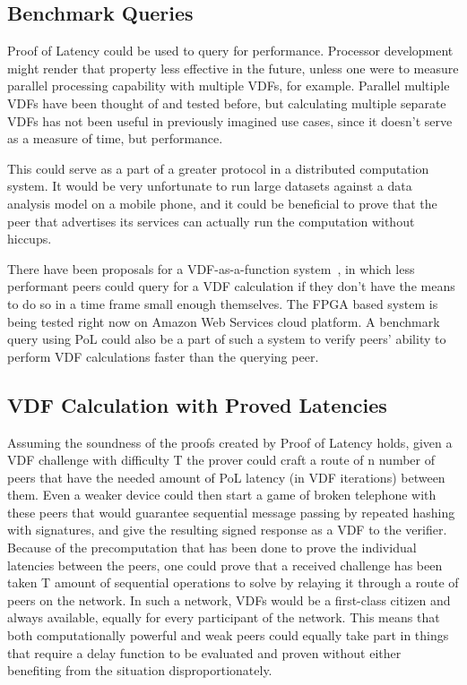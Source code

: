\subsection{Benchmark Queries}
Proof of Latency could be used to query for performance. Processor development might render that property less effective in the future, unless one were to measure parallel processing capability with multiple VDFs, for example. Parallel multiple VDFs have been thought of and tested before, but calculating multiple separate VDFs has not been useful in previously imagined use cases, since it doesn't serve as a measure of time, but performance.

This could serve as a part of a greater protocol in a distributed computation system. It would be very unfortunate to run large datasets against a data analysis model on a mobile phone, and it could be beneficial to prove that the peer that advertises its services can actually run the computation without hiccups.

There have been proposals for a VDF-as-a-function system~\cite{Devlin2020-qw}, in which less performant peers could query for a VDF calculation if they don't have the means to do so in a time frame small enough themselves. The FPGA based system is being tested right now on Amazon Web Services cloud platform. A benchmark query using PoL could also be a part of such a system to verify peers' ability to perform VDF calculations faster than the querying peer.

\subsection{VDF Calculation with Proved Latencies}
Assuming the soundness of the proofs created by Proof of Latency holds, given a VDF challenge with difficulty T the prover could craft a route of n number of peers that have the needed amount of PoL latency (in VDF iterations) between them. Even a weaker device could then start a game of broken telephone with these peers that would guarantee sequential message passing by repeated hashing with signatures, and give the resulting signed response as a VDF to the verifier. Because of the precomputation that has been done to prove the individual latencies between the peers, one could prove that a received challenge has been taken T amount of sequential operations to solve by relaying it through a route of peers on the network. In such a network, VDFs would be a first-class citizen and always available, equally for every participant of the network. This means that both computationally powerful and weak peers could equally take part in things that require a delay function to be evaluated and proven without either benefiting from the situation disproportionately.

